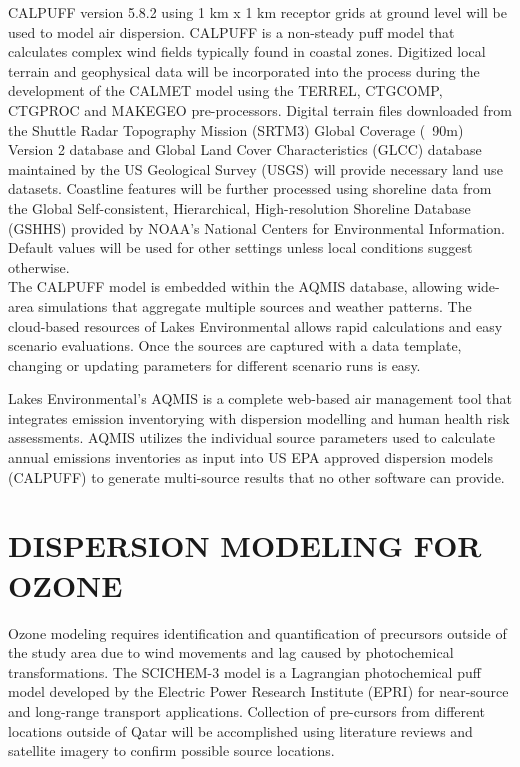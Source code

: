CALPUFF version 5.8.2 using 1 km x 1 km receptor grids at ground level will be used to model air dispersion. CALPUFF is a non-steady puff model that calculates complex wind fields typically found in coastal zones. Digitized local terrain and geophysical data will be incorporated into the process during the development of the CALMET model using the TERREL, CTGCOMP, CTGPROC and MAKEGEO pre-processors.  Digital terrain files downloaded from the Shuttle Radar Topography Mission (SRTM3) Global Coverage (~90m) Version 2 database and Global Land Cover Characteristics (GLCC) database maintained by the US Geological Survey (USGS) will provide necessary land use datasets.  Coastline features will be further processed using shoreline data from the Global Self-consistent, Hierarchical, High-resolution Shoreline Database (GSHHS) provided by NOAA's National Centers for Environmental Information.  Default values will be used for other settings unless local conditions suggest otherwise.\\

The CALPUFF model is embedded within the AQMIS database, allowing wide-area simulations that aggregate multiple sources and weather patterns. The cloud-based resources of Lakes Environmental allows rapid calculations and easy scenario evaluations. Once the sources are captured with a data template, changing or updating parameters for different scenario runs is easy.

Lakes Environmental’s AQMIS is a complete web-based air management tool that integrates emission inventorying with dispersion modelling and human health risk assessments. AQMIS utilizes the individual source parameters used to calculate annual emissions inventories as input into US EPA approved dispersion models (CALPUFF) to generate multi-source results that no other software can provide. 

\section{DISPERSION MODELING FOR OZONE}

Ozone modeling requires identification and quantification of precursors outside of the study area due to wind movements and lag caused by photochemical transformations. The  SCICHEM-3 model is a Lagrangian photochemical puff model developed by the Electric Power Research Institute (EPRI) for near-source and long-range transport applications.  Collection of pre-cursors from different locations outside of Qatar will be accomplished using literature reviews and satellite imagery to confirm possible source locations.

